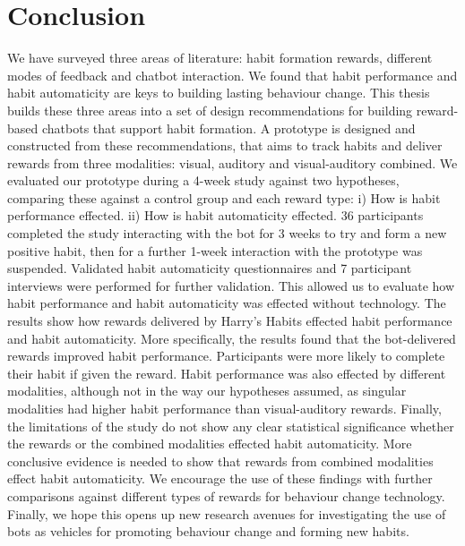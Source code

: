 \section{Conclusion}
We have surveyed three areas of literature: habit formation rewards, different modes of feedback and chatbot interaction. We found that habit performance and habit automaticity are keys to building lasting behaviour change. This thesis builds these three areas into a set of design recommendations for building reward-based chatbots that support habit formation.
A prototype is designed and constructed from these recommendations, that aims to track habits and deliver rewards from three modalities: visual, auditory and visual-auditory combined.
We evaluated our prototype during a 4-week study against two hypotheses, comparing these against a control group and each reward type: i) How is habit performance effected. ii) How is habit automaticity effected. 36 participants completed the study interacting with the bot for 3 weeks to try and form a new positive habit, then for a further 1-week interaction with the prototype was suspended. Validated habit automaticity questionnaires and 7 participant interviews were performed for further validation. This allowed us to evaluate how habit performance and habit automaticity was effected without technology. The results show how rewards delivered by Harry's Habits effected habit performance and habit automaticity. More specifically, the results found that the bot-delivered rewards improved habit performance. Participants were more likely to complete their habit if given the reward. Habit performance was also effected by different modalities, although not in the way our hypotheses assumed, as singular modalities had higher habit performance than visual-auditory rewards. Finally, the limitations of the study do not show any clear statistical significance whether the rewards or the combined modalities effected habit automaticity. More conclusive evidence is needed to show that rewards from combined modalities effect habit automaticity. We encourage the use of these findings with further comparisons against different types of rewards for behaviour change technology. Finally, we hope this opens up new research avenues for investigating the use of bots as vehicles for promoting behaviour change and forming new habits.
